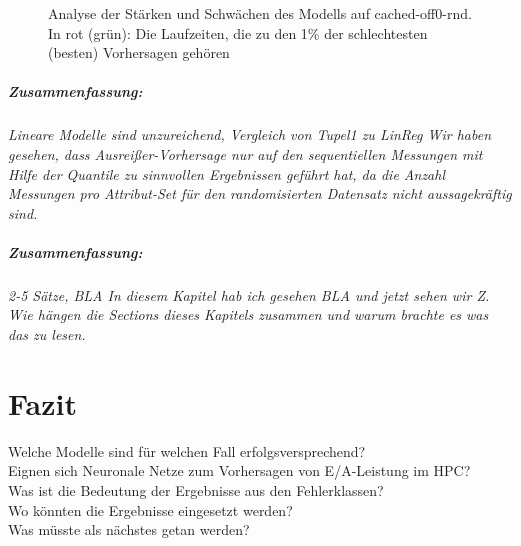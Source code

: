 \documentclass[
	12pt,
	a4paper,
	BCOR10mm,
	DIV14,
	listof=totoc,
	bibliography=totoc,
	headsepline
]{scrreprt}
\begin{document}
\begin{figure}
	\centering
	\caption{Analyse der Stärken und Schwächen des Modells auf cached-off0-rnd. In rot (grün): Die Laufzeiten, die zu den 1\% der schlechtesten (besten) Vorhersagen gehören}
	\label{fig:tupel2_biggest_smallest_rnd}
\end{figure} 

\paragraph{Zusammenfassung:}
\textit{
	Lineare Modelle sind unzureichend, Vergleich von Tupel1 zu LinReg
	Wir haben gesehen, dass Ausreißer-Vorhersage nur auf den sequentiellen Messungen mit Hilfe der Quantile zu sinnvollen Ergebnissen geführt hat, da die Anzahl Messungen pro Attribut-Set für den randomisierten Datensatz nicht aussagekräftig sind.
	}
\clearpage

\paragraph{Zusammenfassung:}
\textit{2-5 Sätze, BLA In diesem Kapitel hab ich gesehen BLA und jetzt sehen wir Z. Wie hängen die Sections dieses Kapitels zusammen und warum brachte es was das zu lesen.}

\chapter{Fazit}
\label{Fazit}
Welche Modelle sind für welchen Fall erfolgsversprechend?\\
Eignen sich Neuronale Netze zum Vorhersagen von E/A-Leistung im HPC?\\
Was ist die Bedeutung der Ergebnisse aus den Fehlerklassen?\\
Wo könnten die Ergebnisse eingesetzt werden?\\
Was müsste als nächstes getan werden?\\
\end{document}
